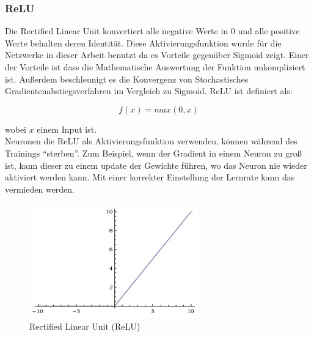 
\subsubsection{ReLU}
Die Rectified Linear Unit konvertiert alle negative Werte in 0 und alle positive Werte behalten deren Identität. Diese Aktivierungsfunktion
wurde für die Netzwerke in dieser Arbeit benutzt da es Vorteile gegenüber Sigmoid zeigt. Einer der Vorteile ist dass die Mathematische
Auswertung der Funktion unkompliziert ist. Außerdem beschleunigt es die Konvergenz von Stochastisches Gradientenabstiegsverfahren im Vergleich zu Sigmoid.
ReLU ist definiert als:

\begin{equation}
  f(x) = max(0, x)
\end{equation}

wobei $x$ einem Input ist.
\\
Neuronen die ReLU als Aktivierungsfunktion verwenden, können während des Trainings ``sterben''. Zum Beispiel, wenn der Gradient in einem Neuron
zu groß ist, kann dieser zu einem update der Gewichte führen, wo das Neuron nie wieder aktiviert werden kann. Mit einer korrekter Einstellung der
Lernrate kann das vermieden werden. \cite{cs231-neural-networks}

\begin{figure}[H]
  \centering
  \includegraphics[width=0.65\textwidth]{resources/nn/relu.jpeg}
  \caption{
    Rectified Linear Unit (ReLU) 
    \cite{neuron-model}
  }
  \label{image:relu}
\end{figure}



